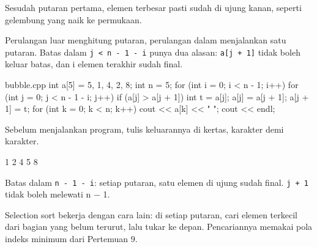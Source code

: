 \documentclass[a4paper]{article}
\begin{document}
\par\vspace{4pt}\par\vspace{6pt}
\begin{Penting}[]
Sesudah putaran pertama, elemen terbesar pasti sudah di ujung kanan, seperti gelembung yang naik ke permukaan.
\end{Penting}
Perulangan luar menghitung putaran, perulangan dalam menjalankan satu putaran. Batas dalam \texttt{j < n - 1 - i} punya dua alasan: \texttt{a[j + 1]} tidak boleh keluar batas, dan i elemen terakhir sudah final.

\begin{MKode}{bubble.cpp}
int a[5] = {5, 1, 4, 2, 8};
int n = 5;
for (int i = 0; i < n - 1; i++) {
    for (int j = 0; j < n - 1 - i; j++) {
        if (a[j] > a[j + 1]) {
            int t = a[j]; a[j] = a[j + 1]; a[j + 1] = t;
        }
    }
}
for (int k = 0; k < n; k++) cout << a[k] << " ";
cout << endl;
\end{MKode}
\begin{Tebak}[]
Sebelum menjalankan program, tulis keluarannya di kertas, karakter demi karakter.
\end{Tebak}
\begin{Jawaban}[]
\begin{MKeluaran}[]
1 2 4 5 8 
\end{MKeluaran}
Batas dalam \texttt{n - 1 - i}: setiap putaran, satu elemen di ujung sudah final. \texttt{j + 1} tidak boleh melewati n − 1.
\end{Jawaban}
Selection sort bekerja dengan cara lain: di setiap putaran, cari elemen terkecil dari bagian yang belum terurut, lalu tukar ke depan. Pencariannya memakai pola indeks minimum dari Pertemuan 9.
\end{document}
